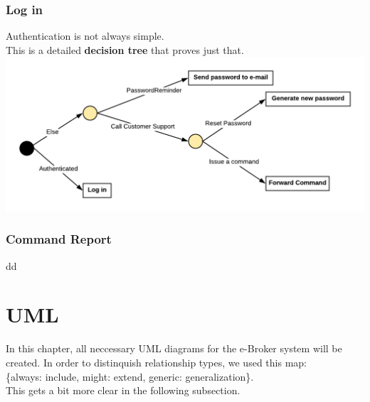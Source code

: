 \documentclass{article}
\begin{document}
\subsubsection{Log in}
Authentication is not always simple.\\
This is a detailed \textbf{decision tree} that proves just that.\\
\hspace*{5mm}\includegraphics[scale=0.4]{decisionTree} 

\subsubsection{Command Report}
dd

\newpage
\section{UML}
In this chapter, all neccessary UML diagrams for the e-Broker system will be created. In order to distinquish relationship types, we used this map: \\\hspace*{16mm}\{always: include, might: extend, generic: generalization\}. \\
This gets a bit more clear in the following subsection. 
\end{document}
